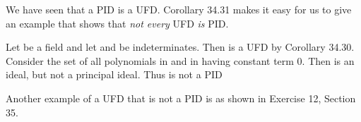 \documentclass[11pt,oneside]{article}
\begin{document}
\begin{BookBody}
We have seen that a PID is a UFD. Corollary 34.31 makes it easy for us to give an example that shows that\textit{ not every} UFD\textit{ is}  PID.

 Let  be a field and let  and  be indeterminates. Then  is a UFD by Corollary 34.30. Consider the set  of all polynomials in  and  in  having constant term 0. Then  is an ideal, but not a principal ideal. Thus  is not a PID\BookEnd{\blacktriangle}

Another example of a UFD that is not a PID is  as shown in Exercise 12, Section 35.

\end{BookBody}

\BookNarrativefalse
\end{document}

